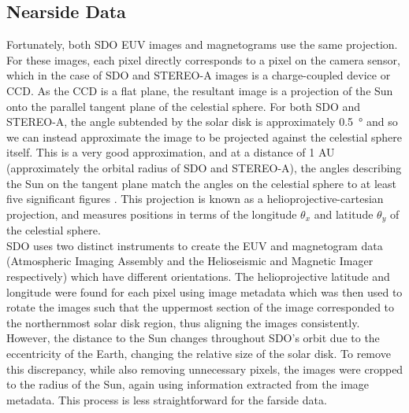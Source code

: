 \documentclass[11pt,a4paper,onecolumn]{report}
\begin{document}
\subsection{Nearside Data}
Fortunately,  both SDO EUV images and magnetograms use the same projection. For
these images, each pixel directly corresponds to a pixel on the camera sensor,
which in the case of SDO and STEREO-A images is a charge-coupled device or
CCD\citep{kaiser_stereo_2008,lemen_atmospheric_2012}. As the CCD is a flat plane,
the resultant image is a projection of the Sun onto the parallel tangent plane of the
celestial sphere.
For both SDO and STEREO-A, the angle subtended by the solar disk is
approximately \SI[]{0.5}[]{\degree} and so we can instead approximate the image
to be projected against the celestial sphere itself. This is a very good
approximation, and at a distance of 1 AU (approximately the orbital radius of
SDO and STEREO-A), the angles describing the Sun on the tangent plane match the
angles on the celestial sphere to at least five significant figures
\citep{thompson_w_t_coordinate_2006}. This projection is known as a
helioprojective-cartesian projection, and measures positions in terms of the
longitude \(\theta_x\) and latitude \(\theta_y\) of the celestial sphere.\\

SDO uses two distinct instruments to create the EUV and magnetogram data
(Atmospheric Imaging Assembly \citep{lemen_atmospheric_2012} and the
Helioseismic and Magnetic Imager \citep{scherrer_helioseismic_2012}
respectively) which have different orientations. The helioprojective latitude
and longitude were found for each pixel using image metadata which was then used
to rotate the images such that the uppermost section of the image corresponded to
the northernmost solar disk region, thus aligning the images consistently.\\

However, the distance to the Sun changes throughout SDO's orbit due to the
eccentricity of the Earth, changing the relative size of the solar disk. To remove
this discrepancy, while also removing unnecessary pixels, the images were
cropped to the radius of the Sun, again using information extracted from the
image metadata. This process is less straightforward for the farside data.
\end{document}
